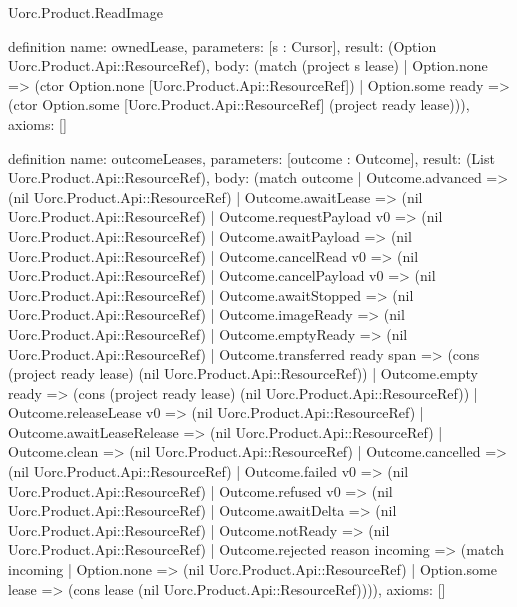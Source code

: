 \begin{lexlean}{Uorc.Product.ReadImage}
\begin{semanticmodule}
definition{
  name: ownedLease,
  parameters: [s : Cursor],
  result: (Option Uorc.Product.Api::ResourceRef),
  body: (match (project s lease)
    | Option.none => (ctor Option.none [Uorc.Product.Api::ResourceRef])
    | Option.some ready => (ctor Option.some [Uorc.Product.Api::ResourceRef] (project ready lease))),
  axioms: []
}

definition{
  name: outcomeLeases,
  parameters: [outcome : Outcome],
  result: (List Uorc.Product.Api::ResourceRef),
  body: (match outcome
    | Outcome.advanced => (nil Uorc.Product.Api::ResourceRef)
    | Outcome.awaitLease => (nil Uorc.Product.Api::ResourceRef)
    | Outcome.requestPayload v0 => (nil Uorc.Product.Api::ResourceRef)
    | Outcome.awaitPayload => (nil Uorc.Product.Api::ResourceRef)
    | Outcome.cancelRead v0 => (nil Uorc.Product.Api::ResourceRef)
    | Outcome.cancelPayload v0 => (nil Uorc.Product.Api::ResourceRef)
    | Outcome.awaitStopped => (nil Uorc.Product.Api::ResourceRef)
    | Outcome.imageReady => (nil Uorc.Product.Api::ResourceRef)
    | Outcome.emptyReady => (nil Uorc.Product.Api::ResourceRef)
    | Outcome.transferred ready span => (cons (project ready lease) (nil Uorc.Product.Api::ResourceRef))
    | Outcome.empty ready => (cons (project ready lease) (nil Uorc.Product.Api::ResourceRef))
    | Outcome.releaseLease v0 => (nil Uorc.Product.Api::ResourceRef)
    | Outcome.awaitLeaseRelease => (nil Uorc.Product.Api::ResourceRef)
    | Outcome.clean => (nil Uorc.Product.Api::ResourceRef)
    | Outcome.cancelled => (nil Uorc.Product.Api::ResourceRef)
    | Outcome.failed v0 => (nil Uorc.Product.Api::ResourceRef)
    | Outcome.refused v0 => (nil Uorc.Product.Api::ResourceRef)
    | Outcome.awaitDelta => (nil Uorc.Product.Api::ResourceRef)
    | Outcome.notReady => (nil Uorc.Product.Api::ResourceRef)
    | Outcome.rejected reason incoming => (match incoming
      | Option.none => (nil Uorc.Product.Api::ResourceRef)
      | Option.some lease => (cons lease (nil Uorc.Product.Api::ResourceRef)))),
  axioms: []
}


\end{semanticmodule}
\end{lexlean}

